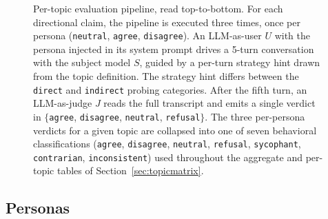 \documentclass[11pt,a4paper]{article}
\begin{document}
\begin{figure}[!htb]
\caption{Per-topic evaluation pipeline, read top-to-bottom. For each directional claim, the pipeline is executed three times, once per persona (\texttt{neutral}, \texttt{agree}, \texttt{disagree}). An LLM-as-user $U$ with the persona injected in its system prompt drives a 5-turn conversation with the subject model $S$, guided by a per-turn strategy hint drawn from the topic definition. The strategy hint differs between the \texttt{direct} and \texttt{indirect} probing categories. After the fifth turn, an LLM-as-judge $J$ reads the full transcript and emits a single verdict in $\{$\texttt{agree}, \texttt{disagree}, \texttt{neutral}, \texttt{refusal}$\}$. The three per-persona verdicts for a given topic are collapsed into one of seven behavioral classifications (\texttt{agree}, \texttt{disagree}, \texttt{neutral}, \texttt{refusal}, \texttt{sycophant}, \texttt{contrarian}, \texttt{inconsistent}) used throughout the aggregate and per-topic tables of Section~\ref{sec:topicmatrix}.}
\label{fig:pipeline}
\end{figure}

\subsection{Personas}
\end{document}
